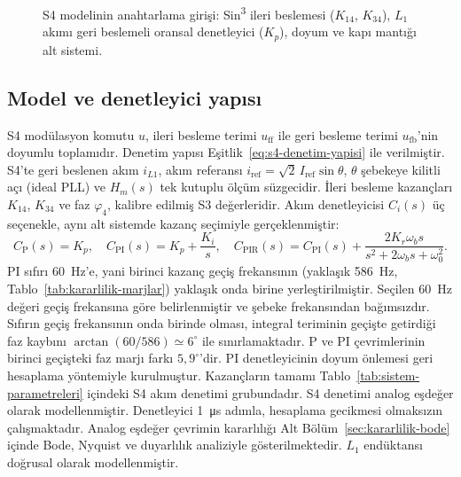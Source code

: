 \begin{figure}[H]
  \centering
  \resizebox{\textwidth}{!}{}
  \caption[S4 modelinin anahtarlama girişi]{S4 modelinin anahtarlama girişi: Sin\textsuperscript{3} ileri beslemesi ($K_{14}$, $K_{34}$), $L_1$ akımı geri beslemeli oransal denetleyici ($K_p$), doyum ve kapı mantığı alt sistemi.}
  \label{fig:s4-anahtarlama-girisi}
\end{figure}

\subsection{Model ve denetleyici yapısı}

S4 modülasyon komutu $u$, ileri besleme terimi $u_{\mathrm{ff}}$ ile geri besleme terimi $u_{\mathrm{fb}}$'nin doyumlu toplamıdır. Denetim yapısı Eşitlik~\eqref{eq:s4-denetim-yapisi} ile verilmiştir. S4'te geri beslenen akım $i_{L1}$, akım referansı $i_{\mathrm{ref}}=\sqrt2\,I_{\mathrm{ref}}\sin\theta$, $\theta$ şebekeye kilitli açı (ideal PLL) ve $H_m(s)$ tek kutuplu ölçüm süzgecidir. İleri besleme kazançları $K_{14}$, $K_{34}$ ve faz $\varphi_4$, kalibre edilmiş S3 değerleridir. Akım denetleyicisi $C_i(s)$ üç seçenekle, aynı alt sistemde kazanç seçimiyle gerçeklenmiştir:
\begin{equation}
  C_{\mathrm{P}}(s)=K_p,\quad
  C_{\mathrm{PI}}(s)=K_p+\frac{K_i}{s},\quad
  C_{\mathrm{PIR}}(s)=C_{\mathrm{PI}}(s)+\frac{2K_r\omega_b s}{s^2+2\omega_b s+\omega_0^2}.
  \label{eq:s4-denetleyiciler}
\end{equation}
PI sıfırı \SI{60}{\hertz}'e, yani birinci kazanç geçiş frekansının (yaklaşık \SI{586}{\hertz}, Tablo~\ref{tab:kararlilik-marjlar}) yaklaşık onda birine yerleştirilmiştir. Seçilen \SI{60}{\hertz} değeri geçiş frekansına göre belirlenmiştir ve şebeke frekansından bağımsızdır. Sıfırın geçiş frekansının onda birinde olması, integral teriminin geçişte getirdiği faz kaybını $\arctan(60/586)\simeq6^{\circ}$ ile sınırlamaktadır. P ve PI çevrimlerinin birinci geçişteki faz marjı farkı $5{,}9^{\circ}$'dir. PI denetleyicinin doyum önlemesi geri hesaplama yöntemiyle kurulmuştur. Kazançların tamamı Tablo~\ref{tab:sistem-parametreleri} içindeki S4 akım denetimi grubundadır. S4 denetimi analog eşdeğer olarak modellenmiştir. Denetleyici \SI{1}{\micro\second} adımla, hesaplama gecikmesi olmaksızın çalışmaktadır. Analog eşdeğer çevrimin kararlılığı Alt Bölüm~\ref{sec:kararlilik-bode} içinde Bode, Nyquist ve duyarlılık analiziyle gösterilmektedir. $L_1$ endüktansı doğrusal olarak modellenmiştir.

